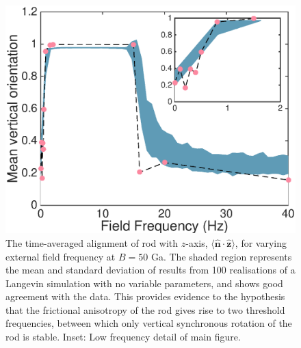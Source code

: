 \documentclass[aps,prl,twocolumn,superscriptaddress]{revtex4-1}
\newcommand{\vcrm}[1]{\mathbf{#1}}
\newcommand{\hvcrm}[1]{\mathbf{\hat{#1}}}
\newcommand{\vc}[1]{\boldsymbol{#1}}
\newcommand{\hvc}[1]{\boldsymbol{\hat{#1}}}
\newcommand{\kk}{\mathrm{k}_B}
\begin{document}
\begin{figure}
\includegraphics[width=0.95\columnwidth]{figs/Figure_n.eps}
    	\caption{\footnotesize The time-averaged alignment of rod with $z$-axis, $\langle \hvcrm{n}\cdot\hvcrm{z}\rangle$, for varying external field frequency at $B=50$ Ga. The shaded region represents the mean and standard deviation of results from 100 realisations of a Langevin simulation with no variable parameters, and shows good agreement with the data. This provides evidence to the hypothesis that the frictional anisotropy of the rod gives rise to two threshold frequencies, between which only vertical synchronous rotation of the rod is stable. Inset: Low frequency detail of main figure.}
\end{figure}





\end{document}
